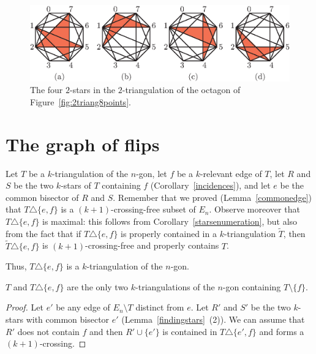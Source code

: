 \documentclass[12pt]{amsart}
\begin{document}
\begin{figure}
\centerline{\includegraphics[scale=1]{2triang8pointsstars.eps}}
\caption{\small{The four $2$-stars in the $2$-triangulation of the octagon of Figure~\ref{fig:2triang8points}.}}\label{fig:2triang8pointsstars}
\end{figure}





\section{The graph of flips}\label{sectionflips}

Let $T$ be a $k$-triangulation of the $n$-gon, let $f$ be a $k$-relevant edge of $T$, let $R$ and $S$ be the two $k$-stars of $T$ containing $f$ (Corollary~\ref{incidences}), and let $e$ be the common bisector of $R$ and $S$. Remember that we proved (Lemma~\ref{commonedge}) that $T\triangle\{e,f\}$ is a $(k+1)$-crossing-free subset of $E_n$. Observe moreover that $T\triangle\{e,f\}$ is maximal: this follows from Corollary~\ref{starsenumeration}, but also from the fact that if $T\triangle\{e,f\}$ is properly contained in a $k$-triangulation $\widetilde{T}$, then $\widetilde{T}\triangle\{e,f\}$ is $(k+1)$-crossing-free and properly contains $T$. 

Thus, $T\triangle\{e,f\}$ is a $k$-triangulation of the $n$-gon.

\begin{lemma}\label{lemma:flip}
$T$ and $T\triangle\{e,f\}$ are the only two $k$-triangulations of the $n$-gon containing $T\setminus\{f\}$.
\end{lemma}

\begin{proof}
Let $e'$ be any edge of $E_n\setminus T$ distinct from $e$. Let $R'$ and $S'$ be the two $k$-stars with common bisector $e'$ (Lemma~\ref{findingstars}~(2)). We can assume that $R'$ does not contain $f$ and then $R'\cup\{e'\}$ is contained in $T\triangle\{e',f\}$ and forms a $(k+1)$-crossing.
\end{proof}
\end{document}
